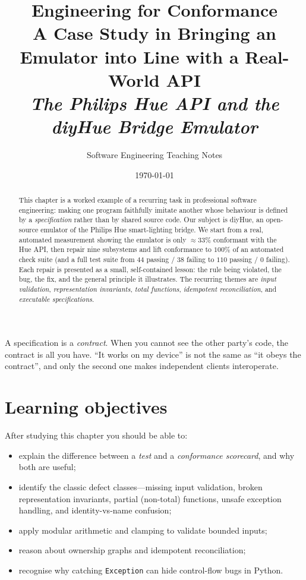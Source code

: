\documentclass[11pt,a4paper]{article}
\title{\vspace{-1.2cm}\textbf{Engineering for Conformance}\\[2pt]
  \large A Case Study in Bringing an Emulator into Line with a Real-World API\\[6pt]
  \normalsize\textit{The Philips Hue API and the diyHue Bridge Emulator}}
\author{Software Engineering Teaching Notes}
\date{\today}
\newcommand{\code}[1]{\texttt{#1}}
\begin{document}
\maketitle

\begin{abstract}
\noindent
This chapter is a worked example of a recurring task in professional software
engineering: making one program faithfully imitate another whose behaviour is
defined by a \emph{specification} rather than by shared source code. Our subject
is \textsf{diyHue}, an open-source emulator of the Philips Hue smart-lighting
bridge. We start from a real, automated measurement showing the emulator is only
$\approx 33\%$ conformant with the Hue API, then repair nine subsystems and lift
conformance to $100\%$ of an automated check suite (and a full test suite from
$44$ passing / $38$ failing to $110$ passing / $0$ failing). Each repair is
presented as a small, self-contained lesson: the rule being violated, the bug,
the fix, and the general principle it illustrates. The recurring themes are
\emph{input validation}, \emph{representation invariants}, \emph{total
functions}, \emph{idempotent reconciliation}, and \emph{executable
specifications}.
\end{abstract}

\begin{keyidea}
A specification is a \emph{contract}. When you cannot see the other party's
code, the contract is all you have. ``It works on my device'' is not the same
as ``it obeys the contract'', and only the second one makes independent clients
interoperate.
\end{keyidea}

\section*{Learning objectives}
After studying this chapter you should be able to:
\begin{itemize}[noitemsep]
  \item explain the difference between a \emph{test} and a \emph{conformance
        scorecard}, and why both are useful;
  \item identify the classic defect classes---missing input validation,
        broken representation invariants, partial (non-total) functions,
        unsafe exception handling, and identity-vs-name confusion;
  \item apply modular arithmetic and clamping to validate bounded inputs;
  \item reason about ownership graphs and idempotent reconciliation;
  \item recognise why catching \code{Exception} can hide control-flow bugs in
        Python.
\end{itemize}
\end{document}

